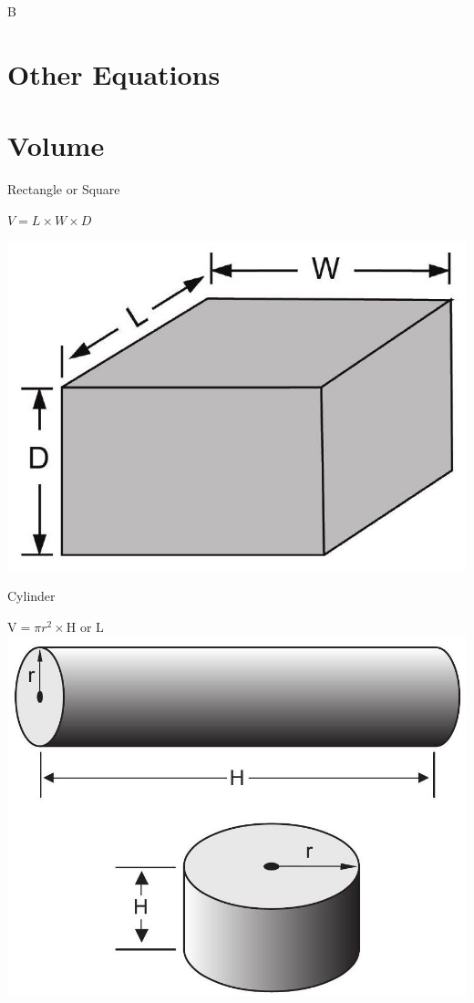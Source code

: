 \documentclass[10pt]{article}
\begin{document}
B

\section{Other Equations}
\section{Volume}
Rectangle or Square

$V=L \times W \times D$

\includegraphics[max width=\textwidth]{2022_09_11_72dbedc910e6e984560cg-02(1)}

Cylinder

$\mathrm{V}=\pi r^{2} \times \mathrm{H}$ or $\mathrm{L}$\\

\includegraphics[max width=\textwidth]{2022_09_11_72dbedc910e6e984560cg-02(2)}
\end{document}
